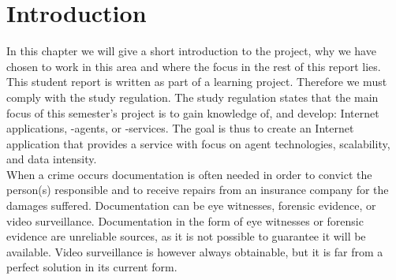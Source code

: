 \chapter{Introduction}
In this chapter we will give a short introduction to the project, why we have chosen to work in this area and where the focus in the rest of this report lies. \\

This student report is written as part of a learning project. Therefore we must comply with the study regulation.
The study regulation states that the main focus of this semester's project is to gain knowledge of, and develop: Internet applications, -agents, or -services.
The goal is thus to create an Internet application that provides a service with focus on agent technologies, scalability, and data intensity. \\

When a crime occurs documentation is often needed in order to convict the person(s) responsible and to receive repairs from an insurance company for the damages suffered.
Documentation can be eye witnesses, forensic evidence, or video surveillance.
Documentation in the form of eye witnesses or forensic evidence are unreliable sources, as it is not possible to guarantee it will be available.
Video surveillance is however always obtainable, but it is far from a perfect solution in its current form.





